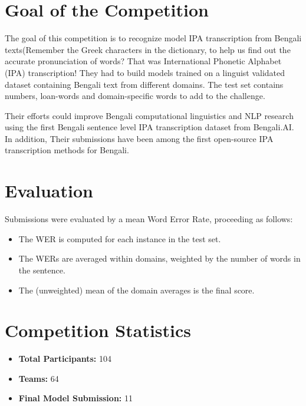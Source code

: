 \section{Goal of the Competition}

The goal of this competition is to recognize model IPA transcription from Bengali texts(Remember the Greek characters in the dictionary, to help us find out the accurate pronunciation of words? That was International Phonetic Alphabet (IPA) transcription! They had to build models trained on a linguist validated dataset containing Bengali text from different domains. The test set contains numbers, loan-words and domain-specific words to add to the challenge.

Their efforts could improve Bengali computational linguistics and NLP research using the first Bengali sentence level IPA transcription dataset from Bengali.AI. In addition, Their submissions have been among the first open-source IPA transcription methods for Bengali.

\newpage
\section{Evaluation}

Submissions were evaluated by a mean Word Error Rate, proceeding as follows:
\begin{itemize}
    \item The WER is computed for each instance in the test set.
    \item The WERs are averaged within domains, weighted by the number of words in the sentence.
    \item The (unweighted) mean of the domain averages is the final score.
\end{itemize}  

\section{Competition Statistics}
\begin{itemize}
    \item \textbf{Total Participants:} 104
    \item \textbf{Teams:} 64
    \item \textbf{Final Model Submission:} 11
\end{itemize}

